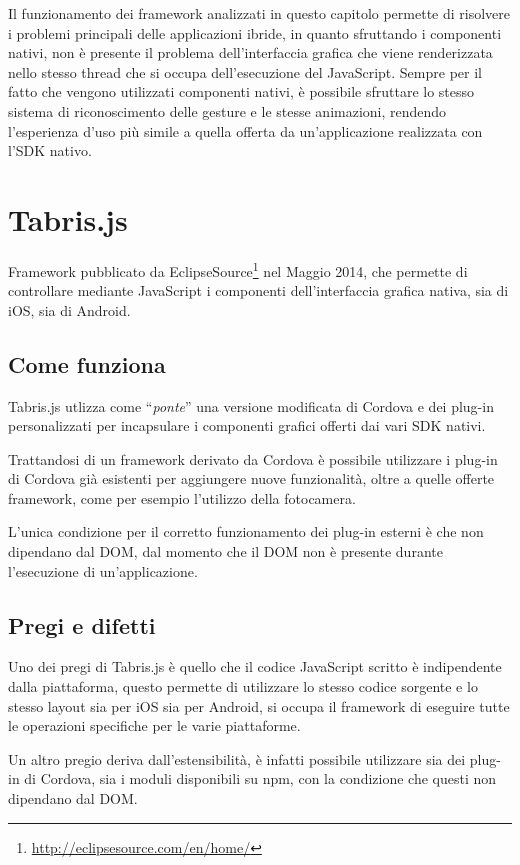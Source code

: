 Il funzionamento dei framework analizzati in questo capitolo permette di risolvere i problemi principali delle applicazioni ibride, in quanto sfruttando i componenti nativi, non è presente il problema dell'interfaccia grafica che viene renderizzata nello stesso thread che si occupa dell'esecuzione del JavaScript.
Sempre per il fatto che vengono utilizzati componenti nativi, è possibile sfruttare lo stesso sistema di riconoscimento delle gesture e le stesse animazioni, rendendo l'esperienza d'uso più simile a quella offerta da un'applicazione realizzata con l'SDK nativo.

\section{Tabris.js}

Framework pubblicato da EclipseSource\footnote{\url{http://eclipsesource.com/en/home/}} nel Maggio 2014, che permette di controllare mediante JavaScript i componenti dell'interfaccia grafica nativa, sia di iOS, sia di Android.

\subsection{Come funziona}
Tabris.js utlizza come ``\textit{ponte}'' una versione modificata di Cordova e dei plug-in personalizzati per incapsulare i componenti grafici offerti dai vari SDK nativi.

Trattandosi di un framework derivato da Cordova è possibile utilizzare i plug-in di Cordova già esistenti per aggiungere nuove funzionalità, oltre  a quelle offerte framework, come per esempio l'utilizzo della fotocamera. 

L'unica condizione per il corretto funzionamento dei plug-in esterni è che non dipendano dal DOM, dal momento che il DOM non è presente durante l'esecuzione di un'applicazione.

\subsection{Pregi e difetti}

Uno dei pregi di Tabris.js è quello che il codice JavaScript scritto è indipendente dalla piattaforma, questo permette di utilizzare lo stesso codice sorgente e lo stesso layout sia per iOS sia per Android, si occupa il framework di eseguire tutte le operazioni specifiche per le varie piattaforme.

Un altro pregio deriva dall'estensibilità, è infatti possibile utilizzare sia dei plug-in di Cordova, sia i moduli disponibili su npm, con la condizione che questi non dipendano dal DOM.

